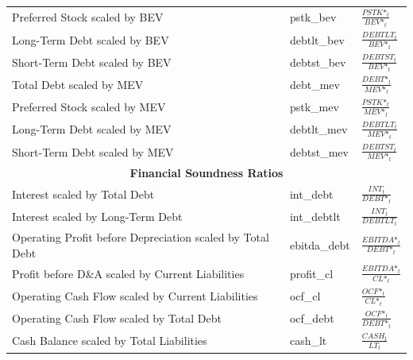 \documentclass[12pt,title,fleqn]{article}
\begin{document}
{\begin{longtable}{@{\extracolsep{\fill}}|p{6cm}|l|p{8cm}|@{}}
    Preferred Stock scaled by BEV & pstk\_bev &$\frac{PSTK\mbox{*}_t}{BEV\mbox{*}_t}$ \\
	
	Long-Term Debt scaled by BEV & debtlt\_bev &$\frac{DEBTLT_t}{BEV\mbox{*}_t}$ \\
	
	Short-Term Debt scaled by BEV & debtst\_bev &$\frac{DEBTST_t}{BEV\mbox{*}_t}$\\
    
    Total Debt scaled by MEV & debt\_mev &$\frac{DEBT\mbox{*}_t}{MEV\mbox{*}_t}$ \\
    
    Preferred Stock scaled by MEV & pstk\_mev &$\frac{PSTK\mbox{*}_t}{MEV\mbox{*}_t}$ \\
    
    Long-Term Debt scaled by MEV & debtlt\_mev &$ \frac{DEBTLT_t}{MEV\mbox{*}_t}$\\
    
    Short-Term Debt scaled by MEV & debtst\_mev &$\frac{DEBTST_t}{MEV\mbox{*}_t}$ \\
    
    \hline 
	\multicolumn{3}{|c|}{\textbf{Financial Soundness Ratios}} \\
	\hline 	
	
	Interest scaled by Total Debt & int\_debt & $\frac{INT_t}{DEBT\mbox{*}_t}$\\
    
    Interest scaled by Long-Term Debt & int\_debtlt &$\frac{INT_t}{DEBTLT_t}$ \\
    
    Operating Profit before Depreciation scaled by Total Debt & ebitda\_debt &$\frac{EBITDA\mbox{*}_t}{DEBT\mbox{*}_t}$ \\

    Profit before D\&A scaled by Current Liabilities & profit\_cl &$\frac{EBITDA\mbox{*}_t}{CL\mbox{*}_t}$ \\
    
    Operating Cash Flow scaled by Current Liabilities & ocf\_cl &$\frac{OCF\mbox{*}_t}{CL\mbox{*}_t}$ \\
    
    Operating Cash Flow scaled by Total Debt & ocf\_debt &$\frac{OCF\mbox{*}_t}{DEBT\mbox{*}_t}$ \\
	
	Cash Balance scaled by Total Liabilities & cash\_lt &$\frac{CASH_t}{LT_t}$ \\
    

\end{longtable}}
\end{document}
